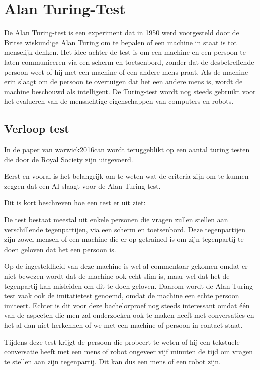 \section{Alan Turing-Test}

De Alan Turing-test is een experiment dat in 1950 werd voorgesteld door de Britse wiskundige Alan Turing om te bepalen of een machine in staat is tot menselijk denken. Het idee achter de test is om een machine en een persoon te laten communiceren via een scherm en toetsenbord, zonder dat de desbetreffende persoon weet of hij met een machine of een andere mens praat. Als de machine erin slaagt om de persoon te overtuigen dat het een andere mens is, wordt de machine beschouwd als intelligent. De Turing-test wordt nog steeds gebruikt voor het evalueren van de mensachtige eigenschappen van computers en robots.

\subsection{Verloop test}

In de paper van warwick2016can wordt teruggeblikt op een aantal turing testen die door de Royal Society zijn uitgevoerd.

Eerst en vooral is het belangrijk om te weten wat de criteria zijn om te kunnen zeggen dat een AI slaagt voor de Alan Turing test. 

Dit is kort beschreven hoe een test er uit ziet: 

De test bestaat meestal uit enkele personen die vragen zullen stellen aan verschillende tegenpartijen, via een scherm en toetsenbord. Deze tegenpartijen zijn zowel mensen of een machine die er op getrained is om zijn tegenpartij te doen geloven dat het een persoon is. 

Op de ingesteldheid van deze machine is wel al commentaar gekomen omdat er niet bewezen wordt dat de machine ook echt slim is, maar wel dat het de tegenpartij kan misleiden om dit te doen geloven. Daarom wordt de Alan Turing test vaak ook de imitatietest genoemd, omdat de machine een echte persoon imiteert. Echter is dit voor deze bachelorproef nog steeds interessant omdat één van de aspecten die men zal onderzoeken ook te maken heeft met conversaties en het al dan niet herkennen of we met een machine of persoon in contact staat. 

Tijdens deze test krijgt de persoon die probeert te weten of hij een tekstuele conversatie heeft met een mens of robot ongeveer vijf minuten de tijd om vragen te stellen aan zijn tegenpartij. Dit kan dus een mens of een robot zijn. 

